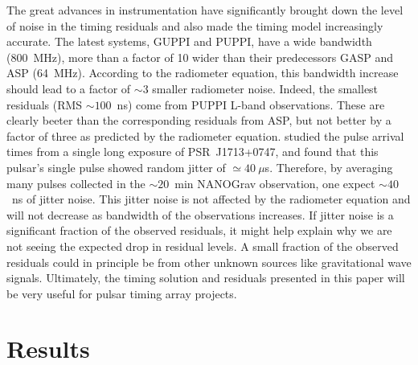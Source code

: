 The great advances in instrumentation have significantly brought down the 
level of noise in the timing residuals and also made the timing model increasingly
accurate.
The latest systems, GUPPI and PUPPI, have a wide bandwidth (800~MHz), more than
a factor of 10 wider than their predecessors GASP and ASP
(64~MHz). According to the radiometer 
equation, this bandwidth increase should lead to a factor of $\sim3$
smaller radiometer noise. 
Indeed, the smallest residuals (RMS $\sim100$~ns) come from PUPPI L-band observations.
These are clearly beeter than the corresponding residuals from ASP, but not better by a factor of three
as predicted by the radiometer equation.
\citet{sc12} studied the pulse arrival times from a single long exposure of
PSR~J1713+0747, and found that this pulsar's single pulse showed random jitter of
$\simeq40~\mu$s. Therefore, by averaging many pulses collected in the
$\sim20$~min NANOGrav observation, one expect $\sim 40$~ns of jitter noise. 
This jitter noise is not affected by the radiometer equation and will not
decrease as bandwidth of the observations increases.
If jitter noise is a significant fraction of the observed residuals, it might
help explain why we are not seeing the expected drop in residual
levels.
A small fraction of the observed residuals could in principle be from other unknown sources like gravitational wave signals.
Ultimately, the timing solution and residuals presented in this paper
will be very useful for pulsar timing array projects.


\section{Results}
\label{sec:res}

